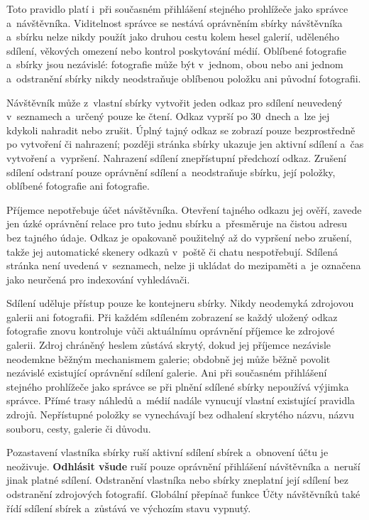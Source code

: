 \documentclass[11pt,a4paper]{article}
\newcommand{\ui}[1]{\textbf{#1}}
\begin{document}
Toto pravidlo platí i~při současném přihlášení stejného prohlížeče jako správce
a~návštěvníka. Viditelnost správce se nestává oprávněním sbírky návštěvníka
a~sbírku nelze nikdy použít jako druhou cestu kolem hesel galerií, uděleného
sdílení, věkových omezení nebo kontrol poskytování médií. Oblíbené fotografie
a~sbírky jsou nezávislé: fotografie může být v~jednom, obou nebo ani jednom
a~odstranění sbírky nikdy neodstraňuje oblíbenou položku ani původní fotografii.

Návštěvník může z~vlastní sbírky vytvořit jeden odkaz pro sdílení neuvedený
v~seznamech a~určený pouze ke čtení. Odkaz vyprší po 30~dnech a~lze jej kdykoli
nahradit nebo zrušit. Úplný tajný odkaz se zobrazí pouze bezprostředně po
vytvoření či nahrazení; později stránka sbírky ukazuje jen aktivní sdílení a~čas
vytvoření a~vypršení. Nahrazení sdílení znepřístupní předchozí odkaz. Zrušení
sdílení odstraní pouze oprávnění sdílení a~neodstraňuje sbírku, její položky,
oblíbené fotografie ani fotografie.

Příjemce nepotřebuje účet návštěvníka. Otevření tajného odkazu jej ověří, zavede
jen úzké oprávnění relace pro tuto jednu sbírku a~přesměruje na čistou adresu
bez tajného údaje. Odkaz je opakovaně použitelný až do vypršení nebo zrušení,
takže jej automatické skenery odkazů v~poště či chatu nespotřebují. Sdílená
stránka není uvedená v~seznamech, nelze ji ukládat do mezipaměti a~je označena
jako neurčená pro indexování vyhledávači.

Sdílení uděluje přístup pouze ke kontejneru sbírky. Nikdy neodemyká zdrojovou
galerii ani fotografii. Při každém sdíleném zobrazení se každý uložený odkaz
fotografie znovu kontroluje vůči aktuálnímu oprávnění příjemce ke zdrojové
galerii. Zdroj chráněný heslem zůstává skrytý, dokud jej příjemce nezávisle
neodemkne běžným mechanismem galerie; obdobně jej může běžně povolit nezávislé
existující oprávnění sdílení galerie. Ani při současném přihlášení stejného
prohlížeče jako správce se při plnění sdílené sbírky nepoužívá výjimka správce.
Přímé trasy náhledů a~médií nadále vynucují vlastní existující pravidla zdrojů.
Nepřístupné položky se vynechávají bez odhalení skrytého názvu, názvu souboru,
cesty, galerie či důvodu.

Pozastavení vlastníka sbírky ruší aktivní sdílení sbírek a~obnovení účtu je
neoživuje. \ui{Odhlásit všude} ruší pouze oprávnění přihlášení návštěvníka
a~neruší jinak platné sdílení. Odstranění vlastníka nebo sbírky zneplatní její
sdílení bez odstranění zdrojových fotografií. Globální přepínač funkce Účty
návštěvníků také řídí sdílení sbírek a~zůstává ve výchozím stavu vypnutý.
\end{document}
